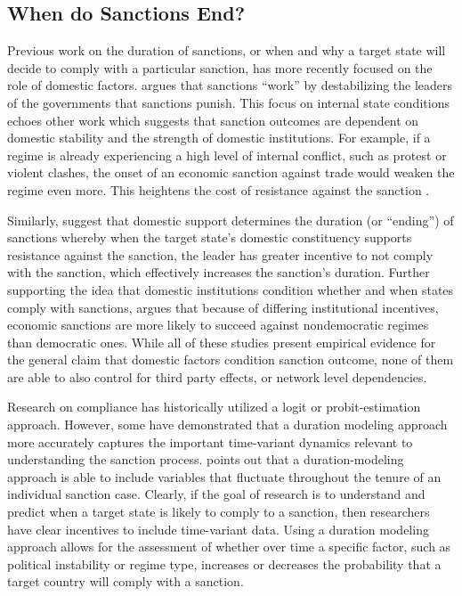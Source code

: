 \subsection*{When do Sanctions End?}
\label{lit}

Previous work on the duration of sanctions, or when and why a target state will decide to comply with a particular sanction, has more recently focused on the role of domestic factors. \cite{marinov2005} argues that sanctions ``work'' by destabilizing the leaders of the governments that sanctions punish. This focus on internal state conditions echoes other work which suggests that sanction outcomes are dependent on domestic stability and the strength of domestic institutions. For example, if a regime is already experiencing a high level of internal conflict, such as protest or violent clashes, the onset of an economic sanction against trade would weaken the regime even more. This heightens the cost of resistance against the sanction \citep{dashti1997}. 

Similarly, \citep{dorussen2001} suggest that domestic support determines the duration (or ``ending'') of sanctions whereby when the target state's domestic constituency supports resistance against the sanction, the leader has greater incentive to not comply with the sanction, which effectively increases the sanction's duration. Further supporting the idea that domestic institutions condition whether and when states comply with sanctions, \cite{lektzian2007} argues that because of differing institutional incentives, economic sanctions are more likely to succeed against nondemocratic regimes than democratic ones. While all of these studies present empirical evidence for the general claim that domestic factors condition sanction outcome, none of them are able to also control for third party effects, or network level dependencies. 

Research on compliance has historically utilized a logit or probit-estimation approach. However, some have demonstrated that a duration modeling approach more accurately captures the important time-variant dynamics relevant to understanding the sanction process. \cite{bolks2000} points out that a duration-modeling approach is able to include variables that fluctuate throughout the tenure of an individual sanction case. Clearly, if the goal of research is to understand and predict when a target state is likely to comply to a sanction, then researchers have clear incentives to include time-variant data. Using a duration modeling approach allows for the assessment of whether over time a specific factor, such as political instability or regime type, increases or decreases the probability that a target country will comply with a sanction.

